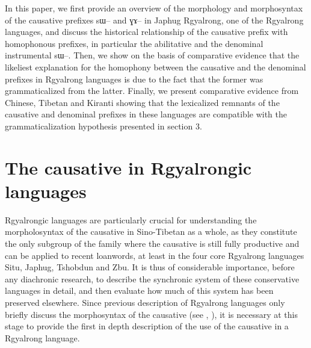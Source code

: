 \documentclass[oldfontcommands,oneside,a4paper,11pt]{article}
\newcommand{\ipa}[1]{{\phon \mbox{#1}}} %
\begin{document}
In this paper, we first provide an overview of the morphology and morphosyntax of the causative prefixes \ipa{sɯ--} and \ipa{ɣɤ--} in Japhug Rgyalrong, one of the Rgyalrong languages, and discuss the historical relationship of the causative prefix with homophonous prefixes, in particular the abilitative and the denominal instrumental \ipa{sɯ--}. Then, we show on the basis of comparative evidence that the likeliest explanation for the homophony between the causative and the denominal prefixes in Rgyalrong languages is due to the fact that the former was grammaticalized from the latter.
Finally, we present comparative evidence from Chinese, Tibetan and Kiranti showing that the lexicalized remnants of the causative and denominal prefixes in these languages are compatible with the grammaticalization hypothesis presented in section 3.

%
%
%


\section{The causative in Rgyalrongic languages}



Rgyalrongic languages are particularly crucial for understanding the morpholosyntax of the causative in Sino-Tibetan as a whole, as they constitute the only subgroup of the family where the causative is still fully productive and can be applied to recent loanwords, at least in the four core Rgyalrong languages Situ, Japhug, Tshobdun and Zbu. It is thus of considerable importance, before any diachronic research, to describe the synchronic system of these conservative languages in detail, and then evaluate how much of this system has been preserved elsewhere. Since previous description of Rgyalrong languages only briefly discuss the morphosyntax of the causative (see \citealt{jackson06paisheng}, \citealt{jacques08zh}), it is necessary at this stage to provide the first in depth description of the use of the causative in a Rgyalrong language.
\end{document}
